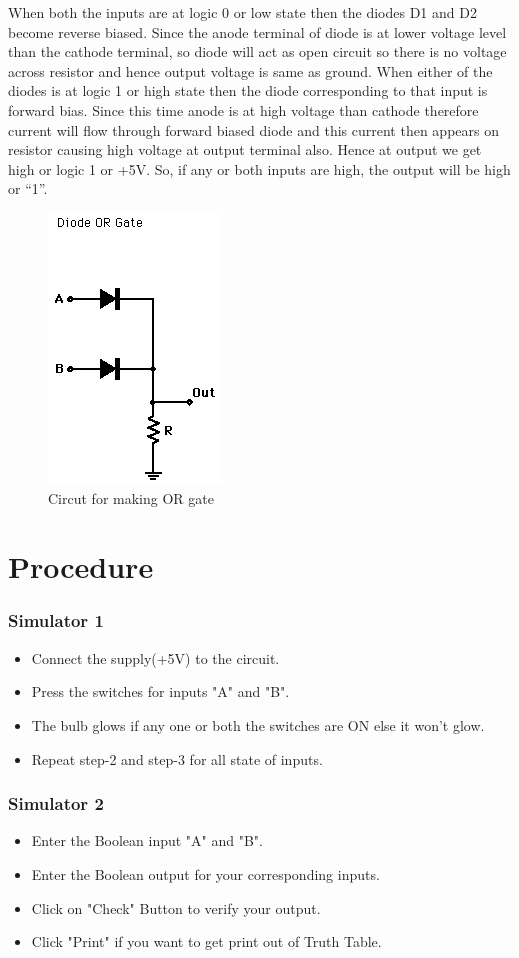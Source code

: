 	When both the inputs are at logic 0 or low state then the diodes D1 and D2 become reverse biased. Since the anode terminal of diode is at lower voltage level than the cathode terminal, so diode will act as open circuit so there is no voltage across resistor and hence output voltage is same as ground. When either of the diodes is at logic 1 or high state then the diode corresponding to that input is forward bias. Since this time anode is at high voltage than cathode therefore current will flow through forward biased diode and this current then appears on resistor causing high voltage at output terminal also. Hence at output we get high or logic 1 or +5V. So, if any or both inputs are high, the output will be high or “1”.
	
	\begin{figure}[h]
		\centering
		\includegraphics[width=0.3\linewidth]{img/exp2/3}
		\caption{Circut for making OR gate}
		\label{fig:2:3}
	\end{figure}
				
\section{Procedure}
	\subsubsection{Simulator 1}
	\begin{itemize}
		\tightlist
		\item Connect the supply(+5V) to the circuit.
		\item Press the switches for inputs "A" and "B".
		\item The bulb glows if any one or both the switches are ON else it won't glow.
		\item Repeat step-2 and step-3 for all state of inputs.
	\end{itemize}

	\subsubsection{Simulator 2}
	\begin{itemize}
		\tightlist
		\item Enter the Boolean input "A" and "B".
		\item Enter the Boolean output for your corresponding inputs.
		\item Click on "Check" Button to verify your output.
		\item Click "Print" if you want to get print out of Truth Table.
	\end{itemize}


